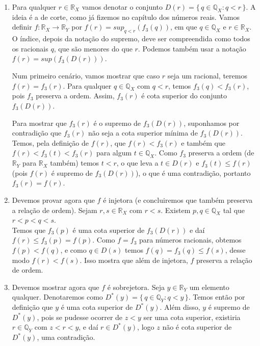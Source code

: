 \documentclass[../main.tex]{subfiles}
\begin{document}
\begin{dem}
\begin{enumerate}
        \begin{enumerate}
            \item Para qualquer $r \in \mathbb{R}_X$ vamos denotar o conjunto $D(r) = \{\,q \in \mathbb{Q}_X : q < r \,\} $. A ideia é a de corte, como já fizemos no capítulo dos números reais.
            Vamos definir $f \colon \mathbb{R}_X \to \mathbb{R}_Y$ por $f(r) = sup_{q < r}( f_3(q) )$, em que $q \in \mathbb{Q}_X$ e $r \in \mathbb{R}_X$. O índice, depois da notação do supremo, deve ser compreendida como todos os racionais $q$, que são menores do que $r$. Podemos também usar a notação $f(r) = sup(f_3(D(r)))$.

            Num primeiro cenário, vamos mostrar que caso $r$ seja um racional, teremos $f(r) = f_3(r)$.
            Para qualquer $q \in \mathbb{Q}_X$ com $q < r$, temos $f_3(q) < f_3(r)$, pois $f_3$ preserva a ordem. Assim, $f_3(r)$ é cota superior do conjunto $f_3(D(r))$.

            Para mostrar que $f_3(r)$ é o supremo de $f_3(D(r))$, suponhamos por contradição que $f_3(r)$ não seja a cota superior mínima de $f_3(D(r))$. Temos, pela definição de $f(r)$, que $f(r) < f_3(r)$ e também que $f(r) < f_3(t) < f_3(r)$ para algum $t \in \mathbb{Q}_X$. Como $f_3$ preserva a ordem (de $\mathbb{R}_Y$ para $\mathbb{R}_X$ também) temos $t < r$, o que leva a 
            $t \in D(r)$ e $f_3(t) \leq f(r)$ (pois $f(r)$ é supremo de $f_3(D(r))$), o que é uma contradição, portanto $f_3(r) = f(r)$.

            \item Devemos provar agora que $f$ é injetora (e concluiremos que também preserva a relação de ordem).
            Sejam $r,s \in \mathbb{R}_X$ com $r < s$. Existem $p,q \in \mathbb{Q}_X$ tal que $r < p < q < s$. \\
            Temos que $f_3(p)$ é uma cota superior de $f_3(D(r))$ e daí $f(r) \leq f_3(p) = f(p)$.
            Como $f=f_3$ para números racionais, obtemos $f(p) < f(q)$, e como $q \in D(s)$ temos $f(q) = f_3(q) \leq f(s)$, desse modo $f(r) < f(s)$. Isso mostra que além de injetora, $f$ preserva a relação de ordem.

            \item Devemos mostrar agora que $f$ é sobrejetora. Seja $y \in \mathbb{R}_Y$ um elemento qualquer.
            Denotaremos como $D^*(y) = \{\,q \in \mathbb{Q}_Y : q < y\,\}$. Temos então por definição que $y$ é uma cota superior de $D^*(y)$. Além disso, $y$ é supremo de $D^*(y)$, pois se pudesse ocorrer de $z < y$ ser uma cota superior, existiria $r \in \mathbb{Q}_Y$ com 
            $z < r < y$, e daí $r \in D^*(y)$, logo $z$ não é cota superior de $D^*(y)$, uma contradição.


\end{enumerate}
\end{enumerate}
\end{dem}
\end{document}
